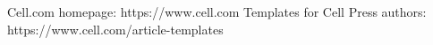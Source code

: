 \documentclass[12pt,letterpaper]{article}
\begin{document}
Cell.com homepage: https://www.cell.com
\newline Templates for Cell Press authors: https://www.cell.com/article-templates




\end{document}
